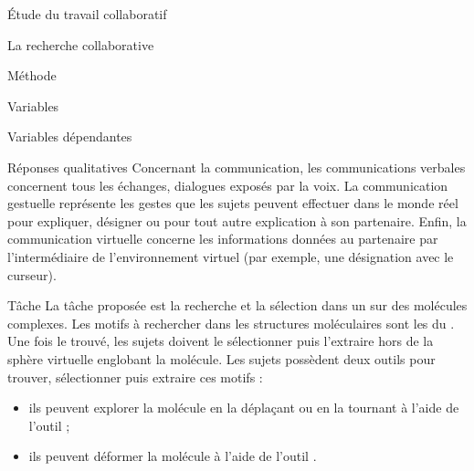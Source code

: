 \documentclass[myfrancais]{mythesis}
\begin{document}
\begin{mypart}{Étude du travail collaboratif}
\begin{mychapter}{La recherche collaborative}
\begin{mysection}{Méthode}
\begin{mysubsection}{Variables}
\begin{mysubsubsection}{Variables dépendantes}
\begin{myparagraph}{ Réponses qualitatives}
							Concernant la communication, les communications verbales concernent tous les échanges, dialogues exposés par la voix.
							La communication gestuelle représente les gestes que les sujets peuvent effectuer dans le monde réel pour expliquer, désigner ou pour tout autre explication à son partenaire.
							Enfin, la communication virtuelle concerne les informations données au partenaire par l'intermédiaire de l'environnement virtuel (par exemple, une désignation avec le curseur).
						\end{myparagraph}
					\end{mysubsubsection}
				\end{mysubsection}
				\begin{mysubsection}[sse-exp1-Tache]{Tâche}
					La tâche proposée est la recherche et la sélection dans un  sur des molécules complexes.
					Les motifs à rechercher dans les structures moléculaires sont les  du .
					Une fois le  trouvé, les sujets doivent le sélectionner puis l'extraire hors de la sphère virtuelle englobant la molécule.
					Les sujets possèdent deux outils pour trouver, sélectionner puis extraire ces motifs :
					\begin{itemize}
						\item ils peuvent explorer la molécule en la déplaçant ou en la tournant à l'aide de l'outil ;
						\item ils peuvent déformer la molécule à l'aide de l'outil .
					\end{itemize}


\end{mysubsection}
\end{mysection}
\end{mychapter}
\end{mypart}
\end{document}
